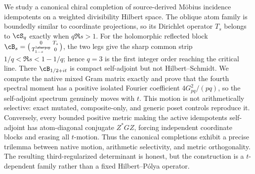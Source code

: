 We study a canonical chiral completion of source-derived M\"obius
incidence idempotents on a weighted divisibility Hilbert space.  The
oblique atom family is boundedly similar to coordinate projections,
so its Dirichlet operator $T_s$ belongs to $\cS_q$ exactly when
$q\Re s>1$.  For the holomorphic reflected block
$\cB_s=\bigl(\begin{smallmatrix}0&T_s\\
T_{1-s}^{\sharpop}&0\end{smallmatrix}\bigr)$, the two legs give the
sharp common strip $1/q<\Re s<1-1/q$; hence $q=3$ is the first integer
order reaching the critical line.  There $\cB_{1/2+it}$ is compact
self-adjoint but not Hilbert--Schmidt.  We compute the native mixed
Gram matrix exactly and prove that the fourth spectral moment has a
positive isolated Fourier coefficient $4G_{pq}^2/(pq)$, so the
self-adjoint spectrum genuinely moves with $t$.  This motion is not
arithmetically selective: exact mutated, composite-only, and generic
poset controls reproduce it.  Conversely, every bounded positive
metric making the active idempotents self-adjoint has atom-diagonal
conjugate $Z^*GZ$, forcing independent coordinate blocks and erasing
all $t$-motion.  Thus the canonical completions exhibit a precise
trilemma between native motion, arithmetic selectivity, and metric
orthogonality.  The resulting third-regularized determinant is honest,
but the construction is a $t$-dependent family rather than a fixed
Hilbert--P\'olya operator.
